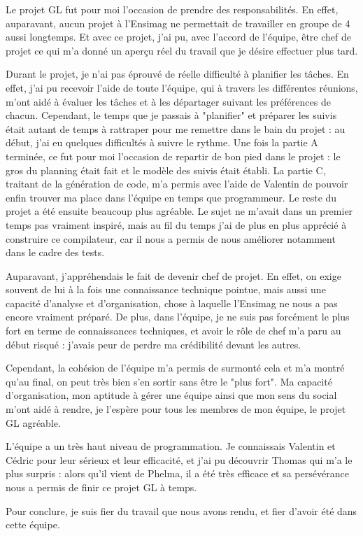 Le projet GL fut pour moi l'occasion de prendre des responsabilités. En effet, auparavant, aucun projet à l'Ensimag ne permettait de travailler en groupe de 4 aussi longtemps. Et avec ce projet, j'ai pu, avec l'accord de l'équipe, être chef de projet ce qui m'a donné un aperçu réel du travail que je désire effectuer plus tard.

Durant le projet, je n'ai pas éprouvé de réelle difficulté à planifier les tâches. En effet, j'ai pu recevoir l'aide de toute l'équipe, qui à travers les différentes réunions, m'ont aidé à évaluer les tâches et à les départager suivant les préférences de chacun.
Cependant, le temps que je passais à "planifier" et préparer les suivis était autant de temps à rattraper pour me remettre dans le bain du projet : au début, j'ai eu quelques difficultés à suivre le rythme. Une fois la partie A terminée, ce fut pour moi l'occasion de repartir de bon pied dans le projet : le gros du planning était fait et le modèle des suivis était établi. La partie C, traitant de la génération de code, m'a permis avec l'aide de Valentin de pouvoir enfin trouver ma place dans l'équipe en temps que programmeur. Le reste du projet a été ensuite beaucoup plus agréable. Le sujet ne m'avait dans un premier temps pas vraiment inspiré, mais au fil du temps j'ai de plus en plus apprécié à construire ce compilateur, car il nous a permis de nous améliorer notamment dans le cadre des tests.

Auparavant, j'appréhendais le fait de devenir chef de projet. En effet, on exige souvent de lui à la fois une connaissance technique pointue, mais aussi une capacité d'analyse et d'organisation, chose à laquelle l'Ensimag ne nous a pas encore vraiment préparé. De plus, dans l'équipe, je ne suis pas forcément le plus fort en terme de connaissances techniques, et avoir le rôle de chef m'a paru au début risqué : j'avais peur de perdre ma crédibilité devant les autres.

Cependant, la cohésion de l'équipe m'a permis de surmonté cela et m'a montré qu'au final, on peut très bien s'en sortir sans être le "plus fort". Ma capacité d'organisation, mon aptitude à gérer une équipe ainsi que mon sens du social m'ont aidé à rendre, je l'espère pour tous les membres de mon équipe, le projet GL agréable. 

L'équipe a un très haut niveau de programmation. Je connaissais Valentin et Cédric pour leur sérieux et leur efficacité, et j'ai pu découvrir Thomas qui m'a le plus surpris : alors qu'il vient de Phelma, il a été très efficace et sa persévérance nous a permis de finir ce projet GL à temps.

Pour conclure, je suis fier du travail que nous avons rendu, et fier d'avoir été dans cette équipe. 


